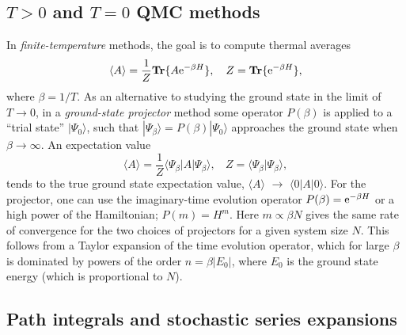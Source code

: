\documentclass[10pt,pre,aps,twocolumn,showpacs,superscriptaddress,floatfix]{revtex4-1}
\begin{document}
\subsection{$T>0$ and $T=0$ QMC methods}
\label{ss:method}

In {\it finite-temperature} methods, the goal is to compute thermal averages
\begin{equation}
\langle A\rangle = \frac{1}{Z}{\bf Tr}\{ A{\rm e}^{-\beta H}\},~~~
Z = {\bf Tr}\{ {\rm e}^{-\beta H}\},
\label{za1}
\end{equation}
where $\beta=1/T$. As an alternative to studying the ground state in the limit of  $T\to 0$, in a {\it ground-state projector} method some 
operator $P(\beta)$  is applied to a ``trial state'' $|\Psi_0\rangle$, such that $|\Psi_\beta \rangle = P(\beta)|\Psi_0\rangle$ approaches the 
ground state when $\beta \to \infty$. An expectation value
\begin{equation}
\langle A\rangle = \frac{1}{Z}\langle \Psi_\beta|A|\Psi_\beta\rangle,~~~~ Z = \langle \Psi_\beta|\Psi_\beta\rangle,
\label{za2}
\end{equation}
tends to the true ground state expectation value, $\langle A\rangle$ $\to$ $\langle 0| A|0\rangle$. For the projector, one can use the imaginary-time
evolution operator $P(\beta)={\rm e}^{-\beta H}$ or a high power of the Hamiltonian; $P(m)=H^m$. Here $m \propto \beta N$ gives the same rate of 
convergence for the two choices of projectors for a given system size $N$. This follows from a Taylor expansion of the time evolution operator, which for large 
$\beta$ is dominated by powers of the order $n=\beta |E_0|$, where $E_0$ is the ground state energy (which is proportional to $N$).

\subsection{Path integrals and stochastic series expansions}
\end{document}
